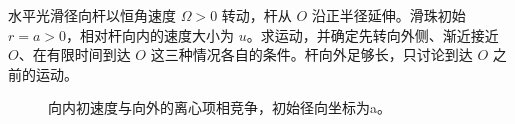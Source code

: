 \begin{exercise}[径向滑珠的回转与到轴（选做）]\label{rot:problem-exercise-4}\label{rot:ex:d6-h4}
水平光滑径向杆以恒角速度 $\Omega>0$ 转动，杆从 $O$ 沿正半径延伸。滑珠初始 $r=a>0$，相对杆向内的速度大小为 $u$。求运动，并确定先转向外侧、渐近接近 $O$、在有限时间到达 $O$ 这三种情况各自的条件。杆向外足够长，只讨论到达 $O$ 之前的运动。
\end{exercise}
\begin{figure}[H]\centering
{}
\caption{向内初速度与向外的离心项相竞争，初始径向坐标为a。}\label{rot:fig:d6-h4-q}
\end{figure}
